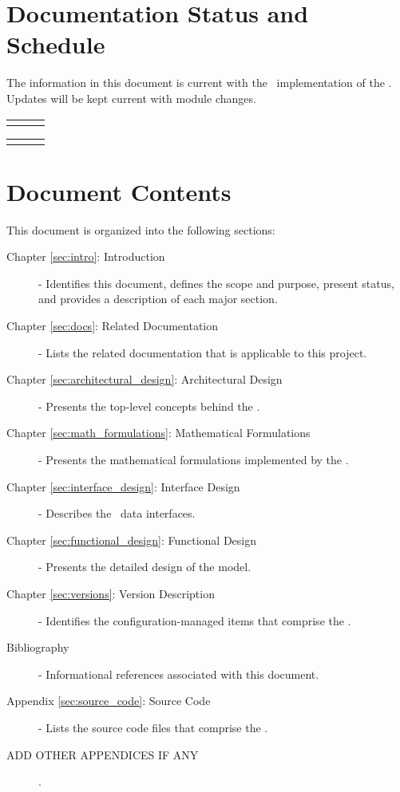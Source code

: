 \documentclass[twoside,11pt,titlepage]{report}
\begin{document}
\section{Documentation Status and Schedule}
The information in this document is current with the \TrickHLAid\
implementation of the \MODEL. Updates will be kept current with
module changes.

\begin{tabular}{||l|l|l|} \hline
\documentHistory
\end{tabular}

\begin{tabular}{||l|l|l|} \hline
\DocumentChangeHistory
\end{tabular}

\section{Document Contents}
This document is organized into the following sections:

\begin{description}

\item[Chapter \ref{sec:intro}: Introduction] -
Identifies this document, defines the scope and purpose, present status,
and provides a description of each major section.

\item[Chapter \ref{sec:docs}: Related Documentation] -
Lists the related documentation that is applicable to this project.

\item[Chapter \ref{sec:architectural_design}: Architectural Design] -
Presents the top-level concepts behind the \MODEL.

\item[Chapter \ref{sec:math_formulations}: Mathematical Formulations] -
Presents the mathematical formulations implemented by the \MODEL.

\item[Chapter \ref{sec:interface_design}: Interface Design] -
Describes the \MODEL\ data interfaces.

\item[Chapter \ref{sec:functional_design}: Functional Design] -
Presents the detailed design of the model.

\item[Chapter \ref{sec:versions}: Version Description] -
Identifies the configuration-managed items that comprise the \MODEL.

\item[Bibliography] -
Informational references associated with this document.

\item[Appendix \ref{sec:source_code}: Source Code] -
Lists the source code files that comprise the \MODEL.

\item[ADD OTHER APPENDICES IF ANY].

\end{description}
\end{document}

